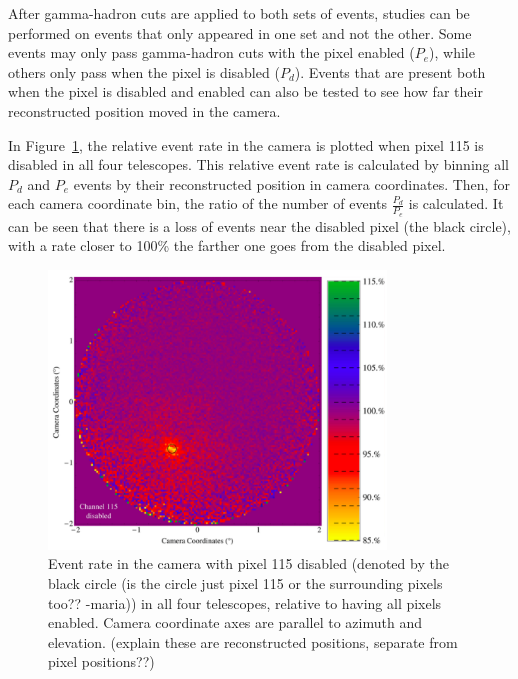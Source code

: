 {    After gamma-hadron cuts are applied to both sets of events, studies can be performed on events that only appeared in one set and not the other.
    Some events may only pass gamma-hadron cuts with the pixel enabled ($P_e$), while others only pass when the pixel is disabled ($P_d$).
    Events that are present both when the pixel is disabled and enabled can also be tested to see how far their reconstructed position moved in the camera.

    In Figure~\ref{fig:dpix_rel_camera}, the relative event rate in the camera is plotted when pixel 115 is disabled in all four telescopes.
    This relative event rate is calculated by binning all $P_d$ and $P_e$ events by their reconstructed position in camera coordinates.
    Then, for each camera coordinate bin, the ratio of the number of events $\frac{P_d}{P_e}$ is calculated.
    It can be seen that there is a loss of events near the disabled pixel (the black circle), with a rate closer to 100\% the farther one goes from the disabled pixel.

    \begin{figure}[!ht]
      \centering
      \includegraphics[width=0.8\textwidth]{images/disabled_pixel/relativerate_camera}
      \caption[Relative Event Rate After Disabling Camera Pixels]{
        Event rate in the camera with pixel 115 disabled (denoted by the {\color{red}black circle (is the circle just pixel 115 or the surrounding pixels too?? -maria)}) in all four telescopes, relative to having all pixels enabled.
        Camera coordinate axes are parallel to azimuth and elevation.
        {\color{red}(explain these are reconstructed positions, separate from pixel positions??)}
      }
      \label{fig:dpix_rel_camera}
    \end{figure}
    
}
